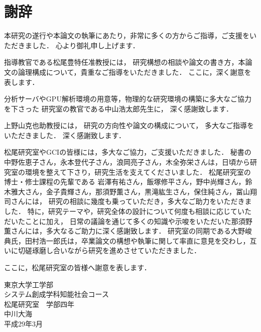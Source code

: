 \chapter*{謝辞}
\fancyhf{}
\rhead{}
\lhead{}
\cfoot{\thepage}

本研究の遂行や本論文の執筆にあたり，非常に多くの方からご指導，ご支援をいただきました．
心より御礼申し上げます．
\vvspace

指導教官である松尾豊特任准教授には，
研究構想の相談や論文の書き方，本論文の論理構成について，貴重なご指導をいただきました．
ここに，深く謝意を表します．
\vvspace

分析サーバやGPU解析環境の用意等，物理的な研究環境の構築に多大なご協力を下さった
研究室の教官である中山浩太郎先生に，
深く感謝致します．
\vvspace

上野山克也助教授には，
研究の方向性や論文の構成について，
多大なご指導をいただきました．
深く感謝致します．
\vvspace

松尾研究室やGCIの皆様には，多大なご協力，ご支援いただきました．
秘書の 中野佐恵子さん，永本登代子さん，浪岡亮子さん，木全弥栄さんは，日頃から研究室の環境を整えて下さり，研究生活を支えてくださいました．
松尾研究室の博士・修士課程の先輩である 岩澤有祐さん，飯塚修平さん，野中尚輝さん，鈴木雅大さん，金子貴輝さん，那須野薫さん，黒滝紘生さん，保住純さん，冨山翔司さんには，
研究の相談に幾度も乗っていただき，多大なご助力をいただきました．
特に，研究テーマや，研究全体の設計について何度も相談に応じていただいたことに加え，
日常の議論を通じて多くの知識や示唆をいただいた那須野薫さんには，多大なるご助力に深く感謝致します．
研究室の同期である大野峻典氏，田村浩一郎氏は，卒業論文の構想や執筆に関して率直に意見を交わし，互いに切磋琢磨し合いながら研究を進めさせていただきました．

ここに，松尾研究室の皆様へ謝意を表します．
\vvspace


\vvspace
\begin{flushright}
東京大学工学部\\
システム創成学科知能社会コース\\
松尾研究室　学部四年\\
中川大海\\
平成29年3月\\
\end{flushright}
